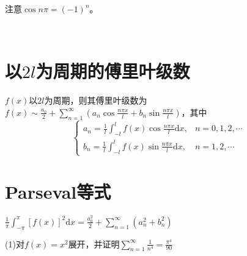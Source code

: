 \begin{note}
  注意$\cos n\pi = (-1)^n$。
\end{note}




~



\section{以$2l$为周期的傅里叶级数}

\begin{definition}[$2l$周期的傅里叶级数]
  $f(x)$以$2l$为周期，则其傅里叶级数为$f(x) \sim \frac{a_0}{2} + \sum\limits_{n = 1}^{\infty}(a_n \cos \frac{n\pi x}{l} + b_n \sin \frac{n \pi x}{l})$，其中
  \begin{equation*}
    \begin{cases}
      a_n = \frac{1}{l}\int _{-l}^l f(x) \cos \frac{n \pi x}{l}\mathrm{d}x, & n = 0,1,2,\cdots\\
      b_n = \frac{1}{l}\int_{-l}^l f(x) \sin \frac{n \pi x}{l} \mathrm{d}x, & n = 1,2,\cdots
    \end{cases}
  \end{equation*}
\end{definition}


\section{Parseval等式}

\begin{theorem}[Parseval等式]
  $\frac{1}{\pi} \int_{-\pi}^{\pi} [f(x)]^2 \mathrm{d} x = \frac{a_0^2}{2} + \sum\limits_{n = 1}^{\infty} (a_n^2 + b_n^2)$
\end{theorem}

\begin{exercise}[计算数项级数]
  (1)对$f(x) = x^2$展开，并证明$\sum\limits_{n = 1}^{\infty} \frac{1}{n^4} = \frac{\pi^4}{90}$
\end{exercise}





